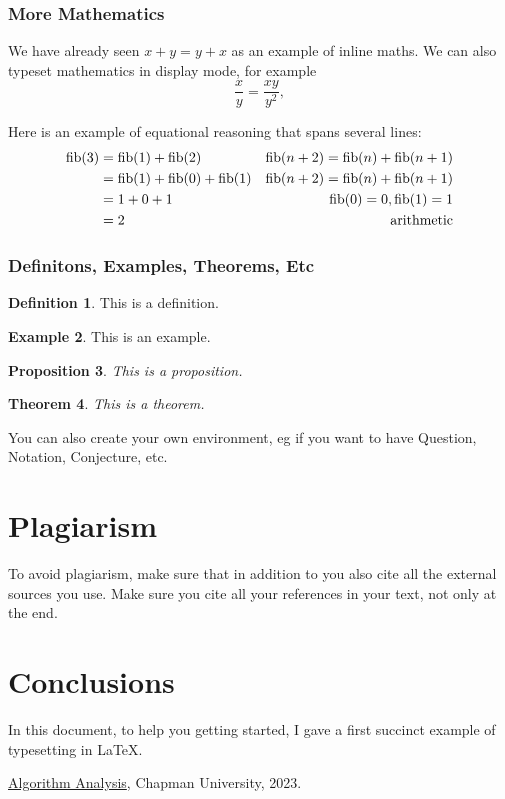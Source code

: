 \documentclass{article}
\theoremstyle{plain}
\newtheorem{theorem}{Theorem}[section]
\newtheorem{proposition}[theorem]{Proposition}
\theoremstyle{definition}
\newtheorem{definition}[theorem]{Definition}
\newtheorem{example}[theorem]{Example}
\theoremstyle{remark}
\begin{document}
\subsubsection{More Mathematics}

We have already seen $x+y=y+x$ as an example of inline maths. We can also typeset mathematics in display mode, for example
$$\frac x y =\frac{xy}{y^2},$$

\noindent
Here is an example of equational reasoning that spans several lines:
\begin{align*}
{\rm fib}(3)
& = {\rm fib}(1) +{\rm fib}(2)  & {\rm fib}(n+2) = {\rm fib}(n)  + {\rm fib}(n+1) \\
& = {\rm fib}(1) +{\rm fib}(0)  + {\rm fib}(1) & {\rm fib}(n+2) = {\rm fib}(n)  + {\rm fib}(n+1) \\
& = 1 + 0  +1 & {\rm fib}(0) = 0,   {\rm fib}(1) = 1\\
& = 2 & {\rm arithmetic}
\end{align*}

\subsubsection{Definitons, Examples, Theorems, Etc}

\begin{definition} 
This is a definition.
\end{definition}

\begin{example}
This is an example.
\end{example}

\begin{proposition}
This is a proposition.
\end{proposition}

\begin{theorem}
This is a theorem.
\end{theorem}

\noindent You can also create your own environment, eg if you want to have Question, Notation, Conjecture, etc.

\section{Plagiarism}

To avoid plagiarism, make sure that in addition to \cite{Alg} you also cite all the external sources you use. Make sure you cite all your references in your text, not only at the end.


\section{Conclusions}\label{conclusions}

In this document, to help you getting started, I gave a first succinct example of typesetting in LaTeX.

\begin{thebibliography}{99}
 \href{https://github.com/alexhkurz/algorithm-analysis-2023}{Algorithm Analysis}, Chapman University, 2023.
\end{thebibliography}
\end{document}
